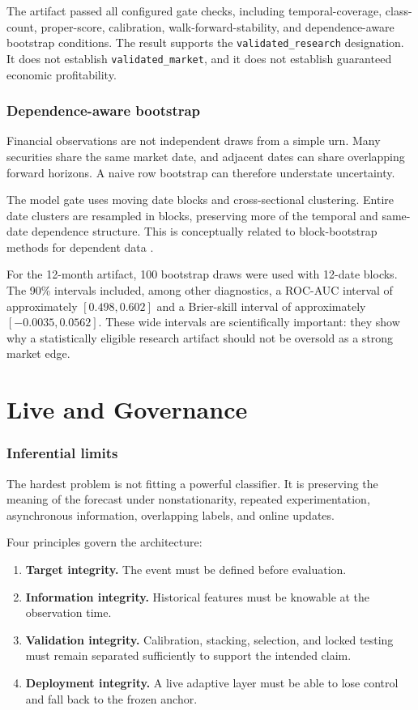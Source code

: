 \documentclass[11pt]{article}
\begin{document}
The artifact passed all configured gate checks, including temporal-coverage, class-count, proper-score, calibration, walk-forward-stability, and dependence-aware bootstrap conditions. The result supports the \texttt{validated\_research} designation. It does not establish \texttt{validated\_market}, and it does not establish guaranteed economic profitability.

\section{Dependence-aware bootstrap}

Financial observations are not independent draws from a simple urn. Many securities share the same market date, and adjacent dates can share overlapping forward horizons. A naive row bootstrap can therefore understate uncertainty.

The model gate uses moving date blocks and cross-sectional clustering. Entire date clusters are resampled in blocks, preserving more of the temporal and same-date dependence structure. This is conceptually related to block-bootstrap methods for dependent data \citep{kunsch1989jackknife,politis1994stationary}.

For the 12-month artifact, 100 bootstrap draws were used with 12-date blocks. The 90\% intervals included, among other diagnostics, a ROC-AUC interval of approximately $[0.498,0.602]$ and a Brier-skill interval of approximately $[-0.0035,0.0562]$. These wide intervals are scientifically important: they show why a statistically eligible research artifact should not be oversold as a strong market edge.

\part{Live and Governance}

\section{Inferential limits}

The hardest problem is not fitting a powerful classifier. It is preserving the meaning of the forecast under nonstationarity, repeated experimentation, asynchronous information, overlapping labels, and online updates.

Four principles govern the architecture:

\begin{enumerate}
\item \textbf{Target integrity.} The event must be defined before evaluation.
\item \textbf{Information integrity.} Historical features must be knowable at the observation time.
\item \textbf{Validation integrity.} Calibration, stacking, selection, and locked testing must remain separated sufficiently to support the intended claim.
\item \textbf{Deployment integrity.} A live adaptive layer must be able to lose control and fall back to the frozen anchor.
\end{enumerate}
\end{document}
